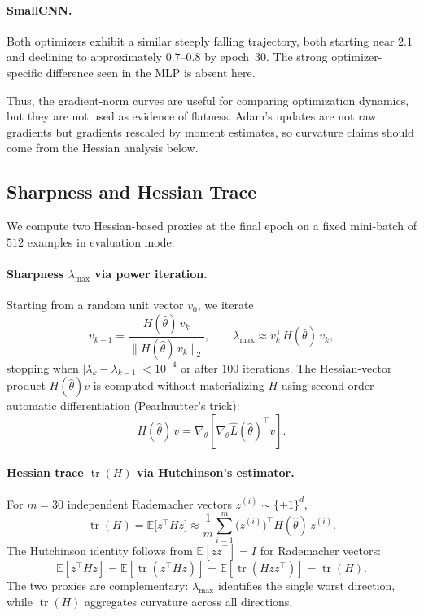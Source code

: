 \documentclass[11pt]{article}
\begin{document}
\paragraph{SmallCNN.}
Both optimizers exhibit a similar steeply falling trajectory, both starting near $2.1$ and declining to approximately $0.7$--$0.8$ by epoch~30. The strong optimizer-specific difference seen in the MLP is absent here.

Thus, the gradient-norm curves are useful for comparing optimization dynamics, but they are not used as evidence of flatness. Adam's updates are not raw gradients but gradients rescaled by moment estimates, so curvature claims should come from the Hessian analysis below.

\subsection{Sharpness and Hessian Trace}
\label{sec:hessian}

We compute two Hessian-based proxies at the final epoch on a fixed mini-batch of $512$ examples in evaluation mode.

\paragraph{Sharpness $\lambda_{\max}$ via power iteration.}
Starting from a random unit vector $v_0$, we iterate
\[
  v_{k+1} = \frac{H(\hat\theta)\,v_k}{\|H(\hat\theta)\,v_k\|_2},
  \qquad
  \lambda_{\max} \approx v_k^\top H(\hat\theta)\,v_k,
\]
stopping when $|\lambda_k - \lambda_{k-1}| < 10^{-4}$ or after $100$ iterations.
The Hessian-vector product $H(\hat\theta)v$ is computed without materializing $H$ using second-order automatic differentiation (Pearlmutter's trick):
\[
  H(\hat\theta)\,v = \nabla_\theta\!\left[\nabla_\theta \widehat{L}(\hat\theta)^\top v\right].
\]

\paragraph{Hessian trace $\operatorname{tr}(H)$ via Hutchinson's estimator.}
For $m = 30$ independent Rademacher vectors $z^{(i)} \sim \{\pm 1\}^d$,
\[
  \operatorname{tr}(H) = \mathbb{E}\bigl[z^\top H z\bigr]
  \approx \frac{1}{m}\sum_{i=1}^{m} \bigl(z^{(i)}\bigr)^\top H(\hat\theta)\,z^{(i)}.
\]
The Hutchinson identity follows from $\mathbb{E}[zz^\top]=I$ for Rademacher vectors:
\[
\mathbb{E}[z^\top H z]
=
\mathbb{E}[\operatorname{tr}(z^\top H z)]
=
\mathbb{E}[\operatorname{tr}(Hzz^\top)]
=
\operatorname{tr}(H).
\]
The two proxies are complementary: $\lambda_{\max}$ identifies the single worst direction, while $\operatorname{tr}(H)$ aggregates curvature across all directions.
\end{document}
